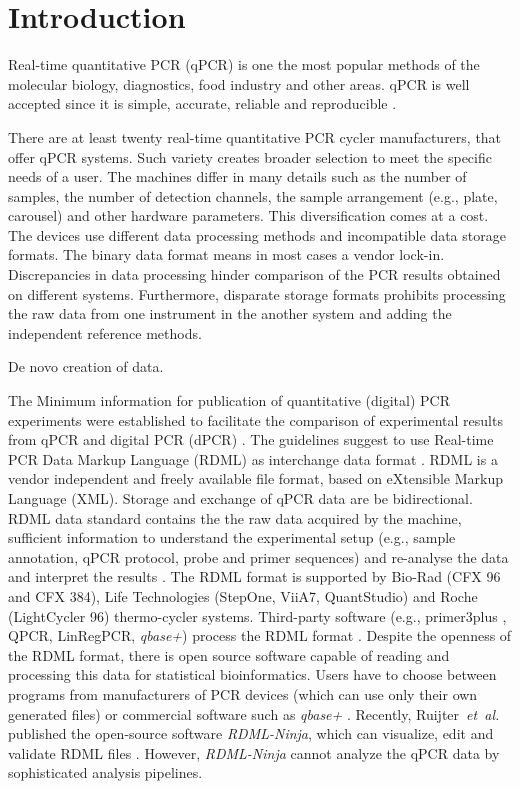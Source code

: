 \documentclass{bioinfo}
\begin{document}
	\section{Introduction}
	
	Real-time quantitative PCR (qPCR) is one the most popular methods of the 
	molecular biology, diagnostics, food industry and other areas. qPCR is well 
	accepted since it is simple, accurate, reliable and reproducible \cite{pabinger_2014}.
	
	There are at least twenty real-time quantitative PCR cycler 
	manufacturers, that offer qPCR systems. Such variety creates broader selection 
	to meet the specific needs of a user. The machines differ in many details such 
	as the number of samples, the number of detection channels, the sample 
	arrangement (e.g., plate, carousel) and other hardware parameters. This 
	diversification comes at a cost. The devices use different data processing 
	methods and incompatible data storage formats. The binary data format means in 
	most cases a vendor lock-in. Discrepancies in data processing hinder comparison 
	of the PCR results obtained on different systems. Furthermore, disparate storage 
	formats prohibits processing the raw data from one instrument in the another 
	system and adding the independent reference methods.
	
	De novo creation of data.
	
	The Minimum information for publication of quantitative (digital) PCR 
	experiments  were established to facilitate the comparison of experimental 
	results from qPCR and digital PCR (dPCR) \cite{huggett_2013}. The guidelines 
	suggest to use Real-time PCR Data Markup Language (RDML) as interchange data 
	format \cite{rdml-ninja_2015}. RDML is a vendor independent and freely available 
	file format, based on eXtensible Markup Language (XML). Storage and exchange of 
	qPCR data are be bidirectional. RDML data standard contains the the raw data 
	acquired by the machine, sufficient information to understand the experimental 
	setup (e.g., sample annotation, qPCR protocol, probe and primer sequences) and 
	re-analyse the data and interpret the results \cite{lefever_rdml_2009}. The RDML 
	format is supported by Bio-Rad (CFX 96 and CFX 384), Life Technologies (StepOne, 
	ViiA7, QuantStudio) and Roche (LightCycler 96) thermo-cycler systems. 
	Third-party software (e.g., primer3plus \cite{untergasser_2007}, QPCR, 
	LinRegPCR, \textit{qbase+}) process the RDML format \cite{pabinger_2014, 
	rdml-ninja_2015}. Despite the openness of the RDML format, there is open source 
	software capable of reading and processing this data for statistical 
	bioinformatics. Users have to choose between programs from manufacturers of PCR 
	devices (which can use only their own generated files) or commercial software 
	such as \textit{qbase+} \cite{pabinger_2014, rdml-ninja_2015}. Recently, 
	Ruijter~\textit{et~al.} published the open-source software \textit{RDML-Ninja}, 
	which can visualize, edit and validate RDML files \cite{rdml-ninja_2015}. 
	However, \textit{RDML-Ninja} cannot analyze the qPCR data by sophisticated 
	analysis pipelines. 
	
\end{document}
